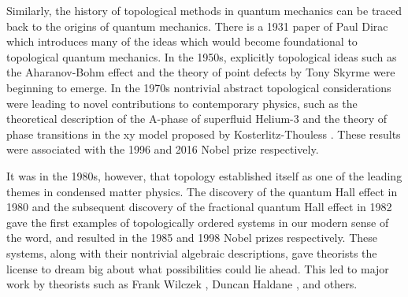 \documentclass{article}
\theoremstyle{definition}
\numberwithin{figure}{section}
\begin{document}
Similarly, the history of topological methods in quantum mechanics can be traced back to the origins of quantum mechanics. There is a 1931 paper of Paul Dirac \cite{dirac1931quantised} which introduces many of the ideas which would become foundational to topological quantum mechanics. In the 1950s, explicitly topological ideas such as the Aharanov-Bohm effect \cite{aharonov1959significance} and the theory of point defects by Tony Skyrme \cite{skyrme1962unified} were beginning to emerge. In the 1970s nontrivial abstract topological considerations were leading to novel contributions to contemporary physics, such as the theoretical description of the A-phase of superfluid Helium-3 \cite{anderson1977phase} and the theory of phase transitions in the xy model proposed by Kosterlitz-Thouless \cite{kosterlitz1973ordering}. These results were associated with the 1996 and 2016 Nobel prize respectively.

It was in the 1980s, however, that topology established itself as one of the leading themes in condensed matter physics. The discovery of the quantum Hall effect in 1980 \cite{klitzing1980new} and the subsequent discovery of the fractional quantum Hall effect in 1982 \cite{tsui1982two} gave the first examples of topologically ordered systems in our modern sense of the word, and resulted in the 1985 and 1998 Nobel prizes respectively. These systems, along with their nontrivial algebraic descriptions, gave theorists the license to dream big about what possibilities could lie ahead. This led to major work by theorists such as Frank Wilczek \cite{wilczek1982quantum, arovas1985statistical}, Duncan Haldane \cite{haldane1983nonlinear, haldane1988model}, and others.
\end{document}
